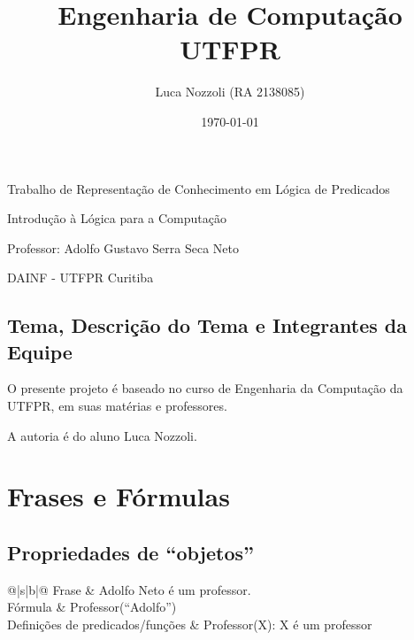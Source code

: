 \documentclass[12pt]{article}
\title{Engenharia de Computação UTFPR}
\author{
        Luca Nozzoli (RA 2138085)
    \and
    \and
    \and
}
\date{\today}
\makeatletter
\newcommand{\frase}[3]{
    \medskip
    \begin{center}
        \begin{tabularx}{\textwidth}{@{}|s|b|@{}}
          \hline
          Frase & #2 \\ \hline
          Fórmula & #3 \\ \hline
          Definições de predicados/funções & #1 \\ \hline
        \end{tabularx}
    \end{center}
}
\newcommand{\q}[1]{``#1''}
\makeatother
\begin{document}
\maketitle
\vfill 
 
\begin{center}
Trabalho de Representação de Conhecimento em Lógica de Predicados

Introdução à Lógica para a Computação

Professor: Adolfo Gustavo Serra Seca Neto

DAINF - UTFPR Curitiba

\end{center}

\newpage


\begin{spacing}{1.5}

\section{Tema, Descrição do Tema e Integrantes da Equipe}
O presente projeto é baseado no curso de Engenharia da Computação da UTFPR, em suas matérias e professores.

A autoria é do aluno Luca Nozzoli.
\newpage

\end{spacing}

 
\section{Frases e Fórmulas}
    
    \subsection{Propriedades de \q{objetos}}
        
        \frase{Professor(X): X é um professor}{Adolfo Neto é um professor.}{Professor(\q{Adolfo})}
        
\end{document}
